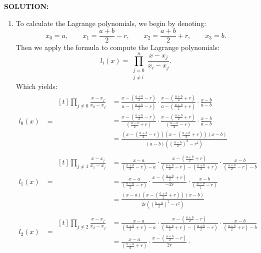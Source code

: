 \documentclass[]{article}
\begin{document}
\noindent \textbf{SOLUTION:}

\begin{enumerate}
    \item To calculate the Lagrange polynomials, we begin by denoting:
    \[
\displaystyle
x_0=a,\qquad
x_1=\frac{a+b}{2}-r,\qquad
x_2=\frac{a+b}{2}+r,\qquad
x_3=b.
\]
\noindent Then we apply the formula to compute the Lagrange polynomials: 
\[
\displaystyle l_i(x) =\prod_{\substack{j=0 \\ j \neq i}}^{n} \frac{x - x_j}{x_i - x_j}.
\]
Which yields:
\begin{align*}
l_0(x) &= \begin{aligned}[t]
\prod_{j\ne 0}\frac{x-x_j}{x_0-x_j}
&= \frac{x-\left(\frac{a+b}{2}-r\right)}{a-\left(\frac{a+b}{2}-r\right)}
\cdot
\frac{x-\left(\frac{a+b}{2}+r\right)}{a-\left(\frac{a+b}{2}+r\right)}
\cdot
\frac{x-b}{a-b}\\
&= \frac{x-\left(\frac{a+b}{2}-r\right)}{\left(\frac{a-b}{2}+r\right)}
\cdot
\frac{x-\left(\frac{a+b}{2}+r\right)}{\left(\frac{a-b}{2}-r\right)}
\cdot
\frac{x-b}{a-b}\\
&= \frac{
\left(x-\left(\frac{a+b}{2}-r\right)\right)
\left(x-\left(\frac{a+b}{2}+r\right)\right)
(x-b)
}{
(a-b)\left(\left(\frac{a-b}{2}\right)^{2}-r^{2}\right)
}
\end{aligned}
\\[8pt]
l_1(x) &= \begin{aligned}[t]
\prod_{j\ne 1}\frac{x-x_j}{x_1-x_j}
&= \frac{x-a}{\left(\frac{a+b}{2}-r\right)-a}
\cdot
\frac{x-\left(\frac{a+b}{2}+r\right)}{\left(\frac{a+b}{2}-r\right)-\left(\frac{a+b}{2}+r\right)}
\cdot
\frac{x-b}{\left(\frac{a+b}{2}-r\right)-b}\\
&= \frac{x-a}{\left(\frac{b-a}{2}-r\right)}
\cdot
\frac{x-\left(\frac{a+b}{2}+r\right)}{-2r}
\cdot
\frac{x-b}{\left(\frac{a-b}{2}-r\right)}\\
&= \frac{
(x-a)\left(x-\left(\frac{a+b}{2}+r\right)\right)(x-b)
}{
2r\left(\left(\frac{b-a}{2}\right)^{2}-r^{2}\right)
}
\end{aligned}
\\[8pt]
l_2(x) &= \begin{aligned}[t]
\prod_{j\ne 2}\frac{x-x_j}{x_2-x_j}
&= \frac{x-a}{\left(\frac{a+b}{2}+r\right)-a}
\cdot
\frac{x-\left(\frac{a+b}{2}-r\right)}{\left(\frac{a+b}{2}+r\right)-\left(\frac{a+b}{2}-r\right)}
\cdot
\frac{x-b}{\left(\frac{a+b}{2}+r\right)-b}\\
&= \frac{x-a}{\left(\frac{b-a}{2}+r\right)}
\cdot
\frac{x-\left(\frac{a+b}{2}-r\right)}{2r}
\cdot

\end{aligned}
\end{align*}
\end{enumerate}
\end{document}
